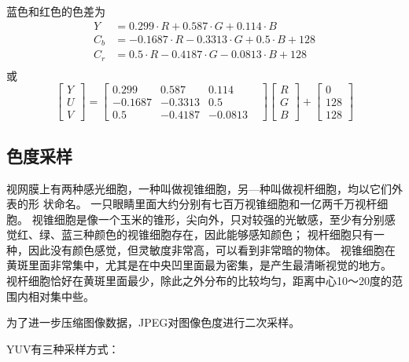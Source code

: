 蓝色和红色的色差为
\begin{equation}
    \begin{aligned}
        Y   &= 0.299   \cdot R + 0.587    \cdot G + 0.114 \cdot B \\
        C_b &= -0.1687 \cdot R - 0.3313   \cdot G + 0.5 \cdot B +128\\
        C_r &= 0.5   \cdot R - 0.4187   \cdot G - 0.0813 \cdot B +128\\
    \end{aligned}    
\end{equation}
或
\begin{equation}
    \begin{bmatrix}
        Y \\ U \\ V
    \end{bmatrix}
    =\begin{bmatrix}
        0.299   & 0.587    & 0.114 & \\
        -0.1687 & -0.3313   & 0.5 & \\
        0.5     & -0.4187   & -0.0813 &
    \end{bmatrix}
    \begin{bmatrix}
        R \\ G \\ B
    \end{bmatrix}
    +\begin{bmatrix}
        0 \\ 128 \\ 128
    \end{bmatrix}
\end{equation}


\subsection{色度采样}
视网膜上有两种感光细胞，一种叫做视锥细胞，另—种叫做视杆细胞，均以它们外表的形
状命名。
一只眼睛里面大约分别有七百万视锥细胞和一亿两千万视杆细胞。
视锥细胞是像一个玉米的锥形，尖向外，只对较强的光敏感，至少有分别感觉红、绿、蓝三种颜色的视锥细胞存在，因此能够感知颜色；
视杆细胞只有一种，因此没有颜色感觉，但灵敏度非常高，可以看到非常暗的物体。
视锥细胞在黄斑里面非常集中，尤其是在中央凹里面最为密集，是产生最清晰视觉的地方。
视杆细胞恰好在黄斑里面最少，除此之外分布的比较均匀，距离中心10～20度的范围内相对集中些。

为了进一步压缩图像数据，JPEG对图像色度进行二次采样。

YUV有三种采样方式：

